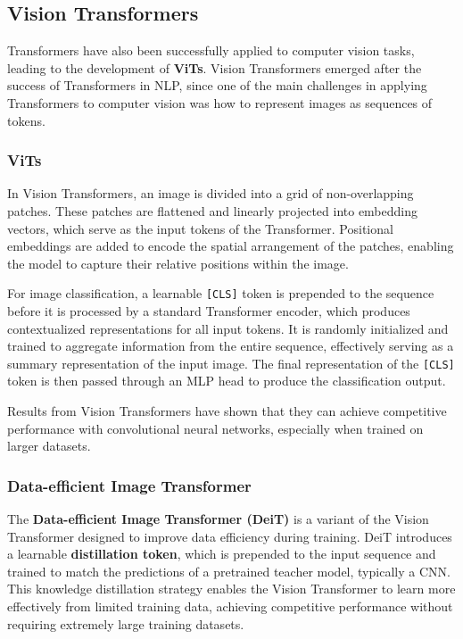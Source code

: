 \subsection{Vision Transformers}

Transformers have also been successfully applied to computer vision tasks, leading to the development of \textbf{ViTs}.
Vision Transformers emerged after the success of Transformers in NLP, since one of the main challenges in applying Transformers to computer vision was how to represent images as sequences of tokens.

\subsubsection{ViTs}

In Vision Transformers, an image is divided into a grid of non-overlapping patches. These patches are flattened and linearly projected into embedding vectors, which serve as the input tokens of the Transformer.
Positional embeddings are added to encode the spatial arrangement of the patches, enabling the model to capture their relative positions within the image.

For image classification, a learnable \texttt{[CLS]} token is prepended to the sequence before it is processed by a standard Transformer encoder, which produces contextualized representations for all input tokens.
It is randomly initialized and trained to aggregate information from the entire sequence, effectively serving as a summary representation of the input image.
The final representation of the \texttt{[CLS]} token is then passed through an MLP head to produce the classification output.

Results from Vision Transformers have shown that they can achieve competitive performance with convolutional neural networks, especially when trained on larger datasets.

\subsubsection{Data-efficient Image Transformer}

The \textbf{Data-efficient Image Transformer (DeiT)} is a variant of the Vision Transformer designed to improve data efficiency during training.
DeiT introduces a learnable \textbf{distillation token}, which is prepended to the input sequence and trained to match the predictions of a pretrained teacher model, typically a CNN.
This knowledge distillation strategy enables the Vision Transformer to learn more effectively from limited training data, achieving competitive performance without requiring extremely large training datasets.

